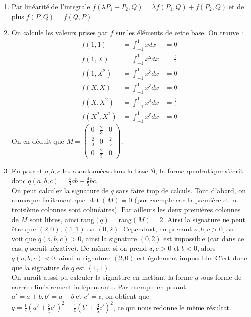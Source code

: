\documentclass[a4paper, 11pt]{article}
\theoremstyle{plain}
\begin{document}
\begin{enumerate}
\item 
Par linéarité de l'integrale 
$f(\lambda P_1 +P_2,Q) = 
\lambda f(P_1,Q) + f(P_2,Q)$ et de plus 
$f(P,Q) = f(Q,P)$.
\item 
On calcule les valeurs prises par $f$ sur les éléments de cette base. On trouve : 
\[
\begin{matrix}
f(1,1) & = \int^1_{-1}xdx   &=0 \\
f(1,X) & = \int^1_{-1} x^2dx   &=\frac{2}{3} \\
f(1,X^2) & = \int^1_{-1}x^3dx   &=0 \\
f(X,X) & = \int^1_{-1}x^3dx   &=0 \\
f(X,X^2) & = \int^1_{-1}x^4dx   &= \frac{2}{5} \\
f(X^2,X^2) & = \int^1_{-1}x^5dx   &= 0
\end{matrix} \]
On en déduit que 
$M = 
\begin{pmatrix}
0 & \frac{2}{3} & 0 \\
\frac{2}{3} & 0 & \frac{2}{5} \\
0& \frac{2}{5} & 0
\end{pmatrix}$.
\item En posant $a,b,c$ les coordonnées dans la base 
$\mathcal{B}$, la forme quadratique s'écrit donc 
$q(a,b,c) = 
\frac{4}{3} ab + \frac{4}{5}bc$. \\
On peut calculer la signature de $q$ sans faire trop de calculs. 
Tout d'abord, on remarque facilement que $\det (M)=0$ (par exemple car la première et la troisième colonnes 
sont colinéaires). Par ailleurs les deux premières colonnes de $M$ sont libres, ainsi 
rang$(q)=$rang$(M) =2$. Ainsi la signature ne peut être que 
$(2,0), (1,1)$ ou $(0,2)$. 
Cependant, en prenant $a,b,c>0$, on voit que $q(a,b,c) >0$, ainsi la signature 
$(0,2)$ est impossible (car dans ce cas, $q$ serait négative). 
De même, si on prend $a,c>0$ et $b<0$, alors 
$q(a,b,c) <0$, ainsi la signature $(2,0)$ est également impossible. 
C'est donc que la signature de $q$ est $(1,1)$.  \\
On aurait aussi pu calculer la signature en mettant la forme $q$ sous forme de carrées linéairement indépendants. 
Par exemple en posant 
$a'=a+b, b'=a-b$ et $c'=c$, on obtient que 
$q =  \frac{1}{3} ( a' + \frac{3}{5}c')^2 - \frac{1}{3} ( b'+ \frac{3}{5}c')^2$, ce qui nous 
redonne le même résultat.
\end{enumerate}
\end{document}
